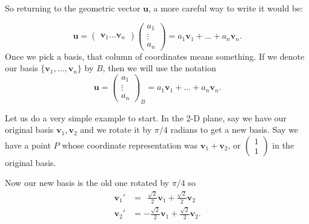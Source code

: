 \documentclass[../master.tex]{subfiles}
\begin{document}
	So returning to the geometric vector $\mathbf u$, a more careful way to write it would be:
	
	\begin{equation}\label{eq:RepU}
		\mathbf u = \begin{pmatrix}
			\mathbf v_1  \dots \mathbf v_n
		\end{pmatrix}\begin{pmatrix} a_1 \\ \vdots \\a_n	\end{pmatrix} = a_1 \mathbf v_1 + \dots + a_n \mathbf v_n.
	\end{equation}	
	Once we pick a basis, that column of coordinates means something. If we denote our basis $\{\mathbf v_1, \dots, \mathbf v_n \}$ by $B$, then we will use the notation 
	\begin{equation*}
		\mathbf u = \begin{pmatrix} a_1 \\ \vdots \\a_n	\end{pmatrix}_B = a_1 \mathbf v_1 + \dots + a_n \mathbf v_n.
	\end{equation*}
	
	
	Let us do a very simple example to start. In the 2-D plane, say we have our original basis $\mathbf v_1, \mathbf v_2$ and we rotate it by $\pi/4$ radians to get a new basis. Say we have a point $P$ whose coordinate representation was $\mathbf v_1 + \mathbf v_2$, or $\begin{pmatrix} 1 \\ 1 \end{pmatrix}$ in the original basis.
	
	Now our new basis is the old one rotated by $\pi/4$ so 
	\begin{align*}
		\mathbf v_1' &= ~~ \frac{\sqrt 2}{2} \mathbf v_1 + \frac{\sqrt 2}{2} \mathbf v_2\\
		\mathbf v_2' &= - \frac{\sqrt 2}{2}\mathbf v_1 + \frac{\sqrt 2}{2}\mathbf v_2.
	\end{align*}
	
\end{document}
